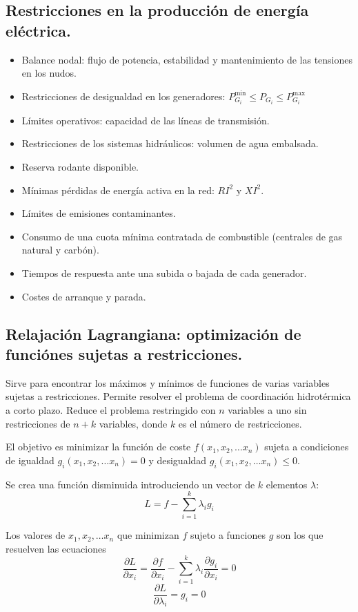 		\subsection{Restricciones en la producción de energía eléctrica.}
			\begin{itemize}
				\item Balance nodal: flujo de potencia, estabilidad y mantenimiento de las tensiones en los nudos.
				\item Restricciones de desigualdad en los generadores: $P_{G_i}^{\text{min}} \leq P_{G_i} \leq P_{G_i}^{\text{max}}$
				\item Límites operativos: capacidad de las líneas de transmisión.
				\item Restricciones de los sistemas hidráulicos: volumen de agua embalsada.
				\item Reserva rodante disponible.
				\item Mínimas pérdidas de energía activa en la red: $RI^2$ y $XI^2$.
				\item Límites de emisiones contaminantes.
				\item Consumo de una cuota mínima contratada de combustible (centrales de gas natural y carbón).
				\item Tiempos de respuesta ante una subida o bajada de cada generador.
				\item Costes de arranque y parada.
			\end{itemize}
			
		\subsection{Relajación Lagrangiana: optimización de funciónes sujetas a restricciones.}
			Sirve para encontrar los máximos y mínimos de funciones de
			varias variables sujetas a restricciones. Permite resolver el problema de coordinación hidrotérmica a
			corto plazo. Reduce el problema restringido con $n$ variables a uno sin restricciones de $n + k$ variables,
			donde $k$ es el número de restricciones.
			
			
			El objetivo es minimizar la función de coste $f(x_1, x_2,\dots x_n)$ sujeta a condiciones de igualdad $g_i(x_1,x_2,\dots x_n) = 0$ y desigualdad $g_i(x_1,x_2,\dots x_n) \leq 0$.
			
			
			Se crea una función disminuida introduciendo un vector de $k$ elementos $\lambda$:
			\[L = f - \sum_{i=1}^{k} \lambda_i g_i\]
			
			Los valores de $x_1,x_2,\dots x_n$ que minimizan $f$ sujeto a funciones $g$ son los que resuelven las ecuaciones
			\[\dfrac{\partial L}{\partial x_i} = \dfrac{\partial f}{\partial x_i} - \sum_{i=1}^{k} \lambda_i \dfrac{\partial g_i}{\partial x_i} = 0\]
			\[\dfrac{\partial L}{\partial \lambda_i} = g_i = 0\]
			
